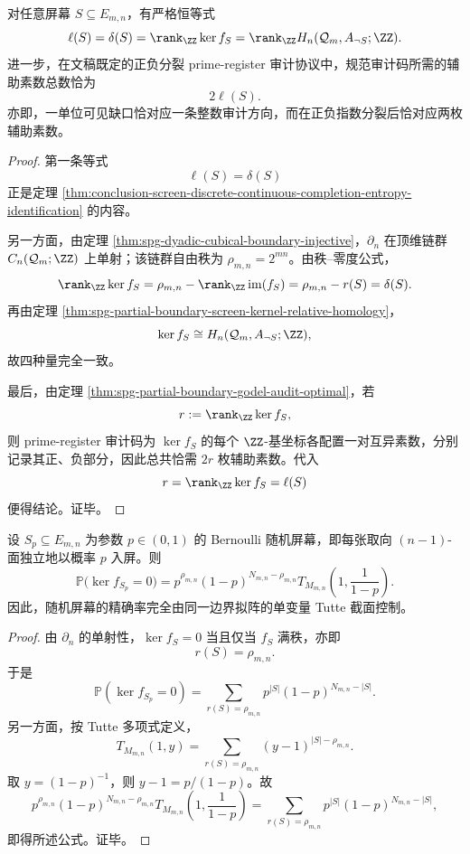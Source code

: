 \begin{theorem}\label{thm:conclusion-screen-completion-homology-prime-register-axis-identification}
对任意屏幕 \(S\subseteq E_{m,n}\)，有严格恒等式
\[
\ell(S)
=
\delta(S)
=
\rank_{\ZZ}\ker f_S
=
\rank_{\ZZ}H_n(\mathcal Q_m,A_{\neg S};\ZZ).
\]
进一步，在文稿既定的正负分裂 prime-register 审计协议中，规范审计码所需的辅助素数总数恰为
\[
2\ell(S).
\]
亦即，一单位可见缺口恰对应一条整数审计方向，而在正负指数分裂后恰对应两枚辅助素数。
\end{theorem}
\begin{proof}
第一条等式
\[
\ell(S)=\delta(S)
\]
正是定理 \ref{thm:conclusion-screen-discrete-continuous-completion-entropy-identification} 的内容。

另一方面，由定理 \ref{thm:spg-dyadic-cubical-boundary-injective}，\(\partial_n\) 在顶维链群 \(C_n(\mathcal Q_m;\ZZ)\) 上单射；该链群自由秩为 \(\rho_{m,n}=2^{mn}\)。由秩--零度公式，
\[
\rank_{\ZZ}\ker f_S
=
\rho_{m,n}-\rank_{\ZZ}\operatorname{im}(f_S)
=
\rho_{m,n}-r(S)
=
\delta(S).
\]
再由定理 \ref{thm:spg-partial-boundary-screen-kernel-relative-homology}，
\[
\ker f_S\cong H_n(\mathcal Q_m,A_{\neg S};\ZZ),
\]
故四种量完全一致。

最后，由定理 \ref{thm:spg-partial-boundary-godel-audit-optimal}，若
\[
r:=\rank_{\ZZ}\ker f_S,
\]
则 prime-register 审计码为 \(\ker f_S\) 的每个 \(\ZZ\)-基坐标各配置一对互异素数，分别记录其正、负部分，因此总共恰需 \(2r\) 枚辅助素数。代入
\[
r=\rank_{\ZZ}\ker f_S=\ell(S)
\]
便得结论。证毕。
\end{proof}

\begin{proposition}\label{prop:conclusion-screen-bernoulli-exactness-tutte-law}
设 \(S_p\subseteq E_{m,n}\) 为参数 \(p\in(0,1)\) 的 Bernoulli 随机屏幕，即每张取向 \((n-1)\)-面独立地以概率 \(p\) 入屏。则
\[
\mathbb P\bigl(\ker f_{S_p}=0\bigr)
=
p^{\rho_{m,n}}(1-p)^{N_{m,n}-\rho_{m,n}}
T_{M_{m,n}}\!\left(1,\frac{1}{1-p}\right).
\]
因此，随机屏幕的精确率完全由同一边界拟阵的单变量 Tutte 截面控制。
\end{proposition}
\begin{proof}
由 \(\partial_n\) 的单射性，\(\ker f_S=0\) 当且仅当 \(f_S\) 满秩，亦即
\[
r(S)=\rho_{m,n}.
\]
于是
\[
\mathbb P(\ker f_{S_p}=0)
=
\sum_{r(S)=\rho_{m,n}} p^{|S|}(1-p)^{N_{m,n}-|S|}.
\]
另一方面，按 Tutte 多项式定义，
\[
T_{M_{m,n}}(1,y)
=
\sum_{r(S)=\rho_{m,n}}(y-1)^{|S|-\rho_{m,n}}.
\]
取 \(y=(1-p)^{-1}\)，则 \(y-1=p/(1-p)\)。故
\[
p^{\rho_{m,n}}(1-p)^{N_{m,n}-\rho_{m,n}}
T_{M_{m,n}}\!\left(1,\frac{1}{1-p}\right)
=
\sum_{r(S)=\rho_{m,n}} p^{|S|}(1-p)^{N_{m,n}-|S|},
\]
即得所述公式。证毕。
\end{proof}

